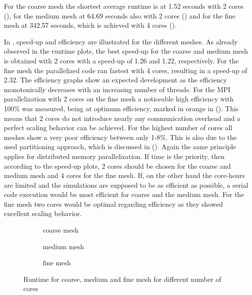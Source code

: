 For the coarse mesh the shortest average runtime is at 1.52 seconds with 2 cores (), for the medium mesh at 64.69 seconds also with 2 cores () and for the fine mesh at 342.57 seconds, which is achieved with 4 cores (). 

In , speed-up and efficiency are illustrated for the different meshes. As already observed in the runtime plots, the best speed-up for the coarse and medium mesh is obtained with 2 cores with a speed-up of 1.26 and 1.22, respectively. For the fine mesh the parallelized code ran fastest with 4 cores, resulting in a speed-up of 2.32. The efficiency graphs show an expected development as the efficiency monotonically decreases with an increasing number of threads. For the MPI parallelization with 2 cores on the fine mesh a noticeable high efficiency with 100\% was measured, being at optimum efficiency, marked in orange in (). This means that 2 cores do not introduce nearly any communication overhead and a perfect scaling behavior can be achieved. 
For the highest number of cores all meshes show a very poor efficiency between only 1-8\%. This is also due to the used partitioning approach, which is discussed in ().
Again the same principle applies for distributed memory parallelization. If time is the priority, then according to the speed-up plots, 2 cores should be chosen for the coarse and medium mesh and 4 cores for the fine mesh. If, on the other hand the core-hours are limited and the simulations are supposed to be as efficient as possible, a serial code execution would be most efficient for coarse and the medium mesh. For the fine mesh two cores would be optimal regarding efficiency as they showed excellent scaling behavior.
\begin{figure}[h!]
	\centering
	\begin{subfigure}{0.7\textwidth}
		\centering
		\resizebox{0.6\width}{!}{}
		\caption{\label{fig::RcoarseMPI} coarse mesh}
	\end{subfigure}
	\hfill
	\begin{subfigure}{0.7\textwidth}
		\centering
		\resizebox{0.6\width}{!}{}
		\caption{\label{fig::RmediumMPI} medium mesh}
	\end{subfigure}
	\hfill
	\begin{subfigure}{0.7\textwidth}
		\centering
		\resizebox{0.6\width}{!}{}
		\caption{\label{fig::RfineMPI} fine mesh}
	\end{subfigure}
	\caption{\label{fig::RuntimeMPI} Runtime for coarse, medium and fine mesh for different number of cores}
\end{figure}
\clearpage



